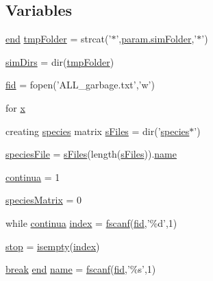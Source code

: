 \subsection*{Variables}
\begin{DoxyCompactItemize}
\item 
\hyperlink{a00025_afb358f48b1646c750fb9da6c6585be2b}{end} \hyperlink{a00027_ad509473eed851f9f5ff4157c02ec8618}{tmp\-Folder} = strcat('$\ast$',\hyperlink{a00032_aa671e3345005bd599e662bcaa115b18a}{param.\-sim\-Folder},'$\ast$')
\item 
\hyperlink{a00027_aae5035eb84b89176ed5b06e136325eff}{sim\-Dirs} = dir(\hyperlink{a00029_ad509473eed851f9f5ff4157c02ec8618}{tmp\-Folder})
\item 
\hyperlink{a00027_ae9011d40c6f13e68e6f07156e0da7c5d}{fid} = fopen('A\-L\-L\-\_\-garbage.\-txt','w')
\item 
for \hyperlink{a00027_a7265972fe485274cfff77a9bb07b8fce}{x}
\item 
creating \hyperlink{a00022}{species} matrix \hyperlink{a00027_a0cf551ea63e8b67362ae2ab776072d1f}{s\-Files} = dir('\hyperlink{a00022}{species}$\ast$')
\item 
\hyperlink{a00027_a7da0c82834970c5f3c3d9224ab832577}{species\-File} = \hyperlink{a00027_a0cf551ea63e8b67362ae2ab776072d1f}{s\-Files}(length(\hyperlink{a00027_a0cf551ea63e8b67362ae2ab776072d1f}{s\-Files})).\hyperlink{a00027_abbf559a76fab59203496b0847ab9502a}{name}
\item 
\hyperlink{a00027_a9c951ebd5bc3f1adce943bee1255f4d6}{continua} = 1
\item 
\hyperlink{a00027_aaeeccb9f4fc7b14ac6b4810a4bf9f71e}{species\-Matrix} = 0
\item 
while \hyperlink{a00030_a9c951ebd5bc3f1adce943bee1255f4d6}{continua} \hyperlink{a00027_a0cd6a44ffb07342cbc7e5ac33bfc9495}{index} = \hyperlink{a00025_a028ac102a731e62fb0a7439381f566c1}{fscanf}(\hyperlink{a00031_ae9011d40c6f13e68e6f07156e0da7c5d}{fid},'\%d',1)
\item 
\hyperlink{a00027_a6bd08e37edf4151f5f6d1fc27a6f227a}{stop} = \hyperlink{a00025_ac10445404f4b83302522defb59e25ef7}{isempty}(\hyperlink{a00102_a0cd6a44ffb07342cbc7e5ac33bfc9495}{index})
\item 
\hyperlink{a00029_a91cf6fbebedd86150a36e5ac3d5d3bfc}{break} \hyperlink{a00025_afb358f48b1646c750fb9da6c6585be2b}{end} \hyperlink{a00027_abbf559a76fab59203496b0847ab9502a}{name} = \hyperlink{a00025_a028ac102a731e62fb0a7439381f566c1}{fscanf}(\hyperlink{a00031_ae9011d40c6f13e68e6f07156e0da7c5d}{fid},'\%s',1)
\item 

\end{DoxyCompactItemize}
